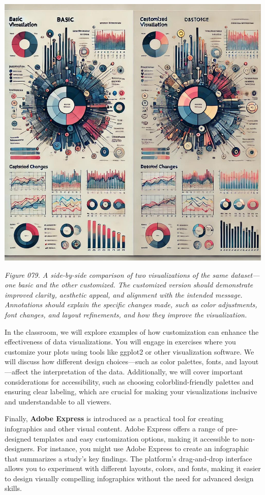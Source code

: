 \documentclass[
]{book}
\begin{document}
\includegraphics[width=1\linewidth,height=\textheight,keepaspectratio]{images/fig079.jpg}

\emph{Figure 079. A side-by-side comparison of two visualizations of the same dataset---one basic and the other customized. The customized version should demonstrate improved clarity, aesthetic appeal, and alignment with the intended message. Annotations should explain the specific changes made, such as color adjustments, font changes, and layout refinements, and how they improve the visualization.}

In the classroom, we will explore examples of how customization can enhance the effectiveness of data visualizations. You will engage in exercises where you customize your plots using tools like ggplot2 or other visualization software. We will discuss how different design choices---such as color palettes, fonts, and layout---affect the interpretation of the data. Additionally, we will cover important considerations for accessibility, such as choosing colorblind-friendly palettes and ensuring clear labeling, which are crucial for making your visualizations inclusive and understandable to all viewers.

Finally, \textbf{Adobe Express} is introduced as a practical tool for creating infographics and other visual content. Adobe Express offers a range of pre-designed templates and easy customization options, making it accessible to non-designers. For instance, you might use Adobe Express to create an infographic that summarizes a study's key findings. The platform's drag-and-drop interface allows you to experiment with different layouts, colors, and fonts, making it easier to design visually compelling infographics without the need for advanced design skills.
\end{document}

